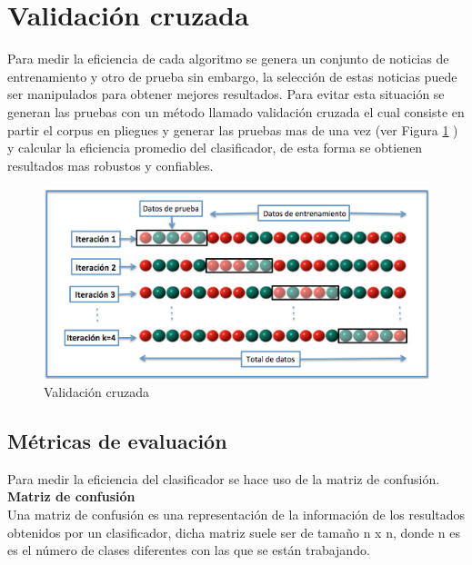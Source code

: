 
\section{Validación cruzada}

Para medir la eficiencia de cada algoritmo se genera un conjunto de noticias de entrenamiento y otro de prueba sin embargo, la selección de estas noticias puede ser manipulados para obtener mejores resultados. Para evitar esta situación se generan las pruebas con un método llamado validación cruzada el cual consiste en partir el corpus en pliegues y generar las pruebas mas de una vez (ver Figura \ref{fig:validacioncruzada} ) y calcular la eficiencia promedio del clasificador, de esta forma se obtienen resultados mas robustos y confiables.


\begin{figure}[h]
\centering
\includegraphics[scale=0.5]{imagenes/Resultados/validacioncruzada.png}
\caption{Validación cruzada}
\label{fig:validacioncruzada}
\end{figure}


\subsection[Métricas]{Métricas de evaluación}

Para medir la eficiencia del clasificador se hace uso de la matriz de confusión.\\

\textbf{Matriz de confusión}\\

Una matriz de confusión es una representación de la información de los resultados obtenidos por un
clasificador, dicha matriz suele ser de tamaño n x n, donde n es es el número de clases diferentes con
las que se están trabajando.

